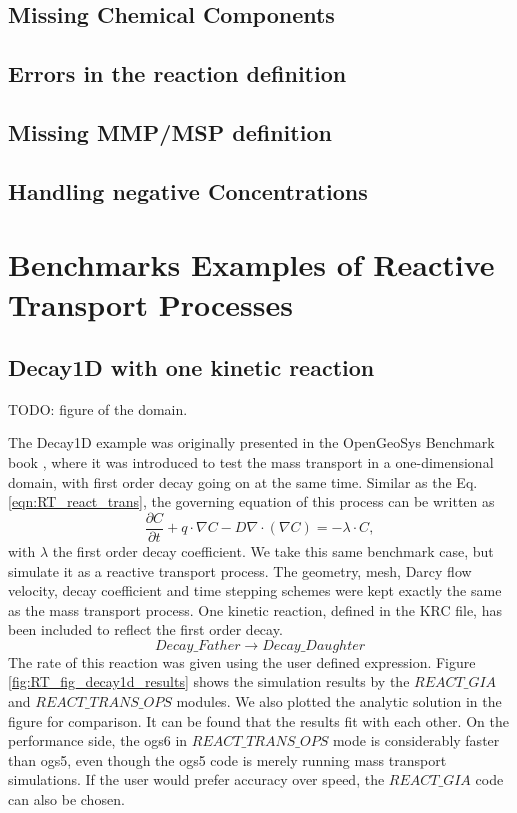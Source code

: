 \subsection{Missing Chemical Components}

\subsection{Errors in the reaction definition}

\subsection{Missing MMP/MSP definition}

\subsection{Handling negative Concentrations}



\section{Benchmarks Examples of Reactive Transport Processes}
\label{sec:benchmarks}
\subsection{Decay1D with one kinetic reaction}

TODO: figure of the domain. 

The Decay1D example was originally presented in the OpenGeoSys Benchmark book \cite{DBB2012}, where it was introduced to test the mass transport in a one-dimensional domain, with first order decay going on at the same time. Similar as the Eq. \ref{eqn:RT_react_trans}, the governing equation of this process can be written as
\begin{equation}
\frac{\partial C}{\partial t} + q \cdot \nabla C - D \nabla \cdot \left( \nabla C \right) = - \lambda \cdot C , 
\end{equation}
with $\lambda$ the first order decay coefficient. We take this same benchmark case, but simulate it as a reactive transport process. The geometry, mesh, Darcy flow velocity, decay coefficient and time stepping schemes were kept exactly the same as the mass transport process. One kinetic reaction, defined in the KRC file, has been included to reflect the first order decay. 
$$
Decay\_Father \rightarrow Decay\_Daughter
$$
The rate of this reaction was given using the user defined expression. Figure \ref{fig:RT_fig_decay1d_results} shows the simulation results by the $REACT\_GIA$ and $REACT\_TRANS\_OPS$ modules. We also plotted the analytic solution in the figure for comparison. It can be found that the results fit with each other. On the performance side, the ogs6 in $REACT\_TRANS\_OPS$ mode is considerably faster than ogs5, even though the ogs5 code is merely running mass transport simulations. If the user would prefer accuracy over speed, the $REACT\_GIA$ code can also be chosen. 

